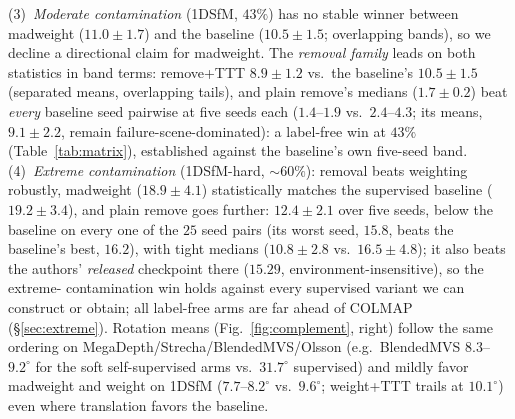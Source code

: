\documentclass{article}
\newcommand{\mad}{madweight}
\renewcommand{\deg}{^{\circ}}
\begin{document}
(3)~\emph{Moderate contamination} (1DSfM, $43\%$) has no stable winner between \mad{}
($11.0\pm1.7$) and the baseline ($10.5\pm1.5$; overlapping bands), so we decline a
directional claim for \mad{}. The \emph{removal family} leads on both statistics in
band terms: remove+TTT $8.9\pm1.2$ vs.\ the baseline's $10.5\pm1.5$ (separated means,
overlapping tails), and plain remove's medians ($1.7\pm0.2$) beat \emph{every} baseline
seed pairwise at five seeds each ($1.4$--$1.9$ vs.\ $2.4$--$4.3$; its means, $9.1\pm2.2$,
remain failure-scene-dominated): a label-free win at $43\%$ (Table~\ref{tab:matrix}),
established against the baseline's own five-seed band.
(4)~\emph{Extreme contamination} (1DSfM-hard, ${\sim}60\%$): removal beats weighting
robustly, \mad{} ($18.9\pm4.1$) statistically matches the supervised baseline
($19.2\pm3.4$), and plain remove goes further: $12.4\pm2.1$ over five seeds, below the
baseline on every one of the $25$ seed pairs (its worst seed, $15.8$, beats the
baseline's best, $16.2$), with tight medians ($10.8\pm2.8$ vs.\ $16.5\pm4.8$); it also beats the authors'
\emph{released} checkpoint there ($15.29$, environment-insensitive), so the extreme-%
contamination win holds against every supervised variant we can construct or obtain; all
label-free arms are far ahead of COLMAP (\S\ref{sec:extreme}). Rotation means (Fig.~\ref{fig:complement}, right) follow the same ordering on
MegaDepth/Strecha/BlendedMVS/Olsson (e.g.\ BlendedMVS $8.3$--$9.2\deg$ for the soft self-supervised arms
vs.\ $31.7\deg$ supervised) and mildly favor madweight and weight on 1DSfM
($7.7$--$8.2\deg$ vs.\ $9.6\deg$; weight+TTT trails at $10.1\deg$) even where translation
favors the baseline. 
\end{document}
